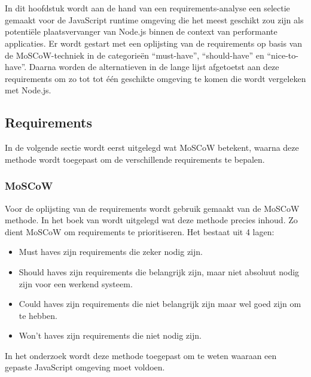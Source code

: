 
\chapter{}%
\label{ch:selectie}

In dit hoofdstuk wordt aan de hand van een requirements-analyse een selectie gemaakt voor de JavaScript runtime omgeving 
die het meest geschikt zou zijn als potentiële plaatsvervanger van Node.js binnen de context van performante applicaties.
Er wordt gestart met een oplijsting van de requirements op basis van de MoSCoW-techniek in de categorieën “must-have”, “should-have” en “nice-to-have”. 
Daarna worden de alternatieven in de lange lijst afgetoetst aan deze requirements om zo tot tot één geschikte omgeving te komen die wordt vergeleken met Node.js.

\section*{Requirements}
In de volgende sectie wordt eerst uitgelegd wat MoSCoW betekent, 
waarna deze methode wordt toegepast om de verschillende requirements te bepalen.
\subsection{MoSCoW}
Voor de oplijsting van de requirements wordt gebruik gemaakt van de MoSCoW methode. 
In het boek van \textcite{Vliet2007} wordt uitgelegd wat deze methode precies inhoud. 
Zo dient MoSCoW om requirements te prioritiseren. Het bestaat uit 4 lagen:
\begin{itemize}
    \item Must haves zijn requirements die zeker nodig zijn.
    \item Should haves zijn requirements die belangrijk zijn, maar niet absoluut nodig zijn voor een werkend systeem.
    \item Could haves zijn requirements die niet belangrijk zijn maar wel goed zijn om te hebben.
    \item Won't haves zijn requirements die niet nodig zijn.
\end{itemize}
In het onderzoek wordt deze methode toegepast om te weten waaraan een gepaste JavaScript omgeving moet voldoen.

